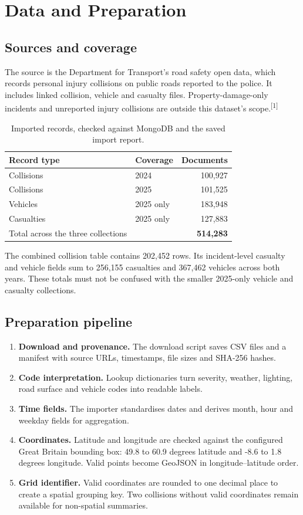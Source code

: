 \documentclass[11pt,a4paper]{article}
\begin{document}
\section{Data and Preparation}
\subsection{Sources and coverage}
The source is the Department for Transport's road safety open data, which records personal injury collisions on public roads reported to the police. It includes linked collision, vehicle and casualty files. Property-damage-only incidents and unreported injury collisions are outside this dataset's scope.\textsuperscript{[1]}
\begin{table}[H]
\caption{Imported records, checked against MongoDB and the saved import report.}
\begin{tabularx}{\textwidth}{L l r}\toprule
\textbf{Record type} & \textbf{Coverage} & \textbf{Documents} \\
\midrule
Collisions & 2024 & 100,927 \\
Collisions & 2025 & 101,525 \\
Vehicles & 2025 only & 183,948 \\
Casualties & 2025 only & 127,883 \\
\midrule
Total across the three collections & & \textbf{514,283} \\
\bottomrule\end{tabularx}
\end{table}
The combined collision table contains 202,452 rows. Its incident-level casualty and vehicle fields sum to 256,155 casualties and 367,462 vehicles across both years. These totals must not be confused with the smaller 2025-only vehicle and casualty collections.
\subsection{Preparation pipeline}
\begin{enumerate}
\item \textbf{Download and provenance.} The download script saves CSV files and a manifest with source URLs, timestamps, file sizes and SHA-256 hashes.
\item \textbf{Code interpretation.} Lookup dictionaries turn severity, weather, lighting, road surface and vehicle codes into readable labels.
\item \textbf{Time fields.} The importer standardises dates and derives month, hour and weekday fields for aggregation.
\item \textbf{Coordinates.} Latitude and longitude are checked against the configured Great Britain bounding box: 49.8 to 60.9 degrees latitude and -8.6 to 1.8 degrees longitude. Valid points become GeoJSON in longitude--latitude order.
\item \textbf{Grid identifier.} Valid coordinates are rounded to one decimal place to create a spatial grouping key. Two collisions without valid coordinates remain available for non-spatial summaries.
\end{enumerate}
\end{document}
